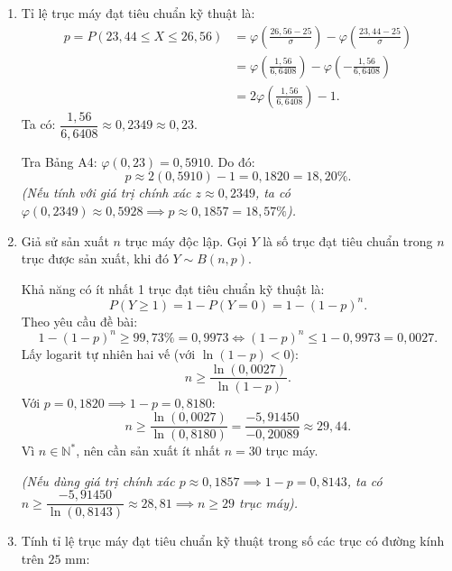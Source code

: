 \documentclass[12pt,a4paper]{article}
\theoremstyle{definition}
\begin{document}
\begin{enumerate}[label=\arabic*)]
    \item Tỉ lệ trục máy đạt tiêu chuẩn kỹ thuật là:
    \begin{align*}
    p = P(23{,}44 \le X \le 26{,}56) &= \varphi\left(\frac{26{,}56 - 25}{\sigma}\right) - \varphi\left(\frac{23{,}44 - 25}{\sigma}\right) \\
    &= \varphi\left(\frac{1{,}56}{6{,}6408}\right) - \varphi\left(-\frac{1{,}56}{6{,}6408}\right) \\
    &= 2\varphi\left(\frac{1{,}56}{6{,}6408}\right) - 1.
    \end{align*}
    Ta có: $\dfrac{1{,}56}{6{,}6408} \approx 0{,}2349 \approx 0{,}23$.
    
    Tra Bảng A4: $\varphi(0{,}23) = 0{,}5910$. Do đó:
    \[
    p \approx 2(0{,}5910) - 1 = 0{,}1820 = 18{,}20\%.
    \]
    \textit{(Nếu tính với giá trị chính xác $z \approx 0{,}2349$, ta có $\varphi(0{,}2349) \approx 0{,}5928 \implies p \approx 0{,}1857 = 18{,}57\%$).}

    \item Giả sử sản xuất $n$ trục máy độc lập. Gọi $Y$ là số trục đạt tiêu chuẩn trong $n$ trục được sản xuất, khi đó $Y \sim B(n, p)$.

    Khả năng có ít nhất 1 trục đạt tiêu chuẩn kỹ thuật là:
    \[
    P(Y \ge 1) = 1 - P(Y = 0) = 1 - (1 - p)^n.
    \]
    Theo yêu cầu đề bài:
    \[
    1 - (1 - p)^n \ge 99{,}73\% = 0{,}9973 \iff (1 - p)^n \le 1 - 0{,}9973 = 0{,}0027.
    \]
    Lấy logarit tự nhiên hai vế (với $\ln(1 - p) < 0$):
    \[
    n \ge \frac{\ln(0{,}0027)}{\ln(1 - p)}.
    \]
    Với $p = 0{,}1820 \implies 1 - p = 0{,}8180$:
    \[
    n \ge \frac{\ln(0{,}0027)}{\ln(0{,}8180)} = \frac{-5{,}91450}{-0{,}20089} \approx 29{,}44.
    \]
    Vì $n \in \mathbb{N}^*$, nên cần sản xuất ít nhất $n = 30$ trục máy.
    
    \textit{(Nếu dùng giá trị chính xác $p \approx 0{,}1857 \implies 1 - p = 0{,}8143$, ta có $n \ge \dfrac{-5{,}91450}{\ln(0{,}8143)} \approx 28{,}81 \implies n \ge 29$ trục máy).}

    \item Tính tỉ lệ trục máy đạt tiêu chuẩn kỹ thuật trong số các trục có đường kính trên $25\text{ mm}$:


\end{enumerate}
\end{document}
